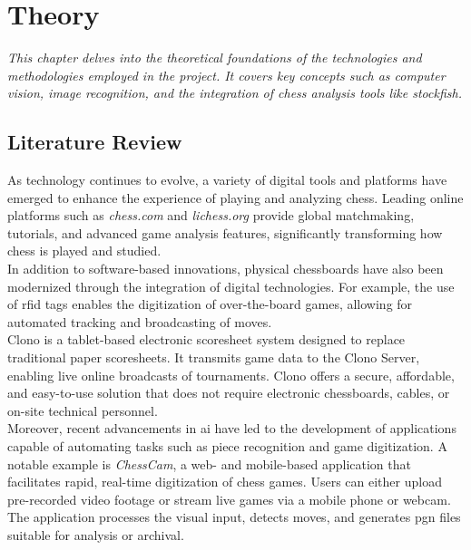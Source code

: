 \chapter{Theory}
\label{chp:theory}

\begin{center}
    \textit{This chapter delves into the theoretical foundations of the technologies and methodologies employed in the project. It covers key concepts such as computer vision, image recognition, and the integration of chess analysis tools like \Gls{stockfish}.}    
\end{center}

\section{Literature Review}
\label{sec:literature-review}

As technology continues to evolve, a variety of digital tools and platforms have emerged to enhance the experience of playing and analyzing chess. Leading online platforms such as \textit{chess.com} and \textit{lichess.org} provide global matchmaking, tutorials, and advanced game analysis features, significantly transforming how chess is played and studied. \\

In addition to software-based innovations, physical chessboards have also been modernized through the integration of digital technologies. For example, the use of \gls{rfid} tags enables the digitization of over-the-board games, allowing for automated tracking and broadcasting of moves. \cite{quora:shah} \\

Clono is a tablet-based electronic scoresheet system designed to replace traditional paper scoresheets. It transmits game data to the Clono Server, enabling live online broadcasts of tournaments. Clono offers a secure, affordable, and easy-to-use solution that does not require electronic chessboards, cables, or on-site technical personnel. \cite{clono} \\

Moreover, recent advancements in \gls{ai} have led to the development of applications capable of automating tasks such as piece recognition and game digitization. A notable example is \textit{ChessCam}, a web- and mobile-based application that facilitates rapid, real-time digitization of chess games. Users can either upload pre-recorded video footage or stream live games via a mobile phone or webcam. The application processes the visual input, detects moves, and generates \gls{pgn} files suitable for analysis or archival. \cite{chess:chesscam, lichess:chesscam}

